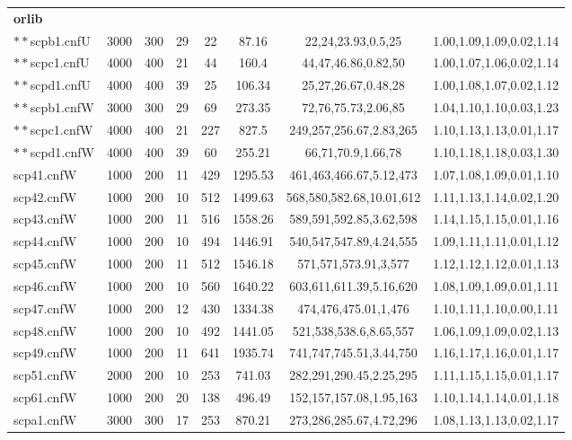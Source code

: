 \begin{table*}[t!]
{\begin{tabular}{lccccccc}
{\bf orlib}     &      &     &    &    &       &                    &\\ 
 $**$scpb1.cnfU & 3000 & 300 & 29 & 22 & 87.16 & 22,24,23.93,0.5,25 & 1.00,1.09,1.09,0.02,1.14 \\ 
 $**$scpc1.cnfU & 4000 & 400 & 21 & 44 & 160.4 & 44,47,46.86,0.82,50 & 1.00,1.07,1.06,0.02,1.14 \\ 
 $**$scpd1.cnfU & 4000 & 400 & 39 & 25 & 106.34 & 25,27,26.67,0.48,28 & 1.00,1.08,1.07,0.02,1.12 \\ 
 $**$scpb1.cnfW & 3000 & 300 & 29 & 69 & 273.35 & 72,76,75.73,2.06,85 & 1.04,1.10,1.10,0.03,1.23 \\ 
 $**$scpc1.cnfW & 4000 & 400 & 21 & 227 & 827.5 & 249,257,256.67,2.83,265 & 1.10,1.13,1.13,0.01,1.17 \\ 
 $**$scpd1.cnfW & 4000 & 400 & 39 & 60 & 255.21 & 66,71,70.9,1.66,78 & 1.10,1.18,1.18,0.03,1.30 \\
 scp41.cnfW & 1000 & 200 & 11 & 429 & 1295.53 & 461,463,466.67,5.12,473 & 1.07,1.08,1.09,0.01,1.10 \\ 
 scp42.cnfW & 1000 & 200 & 10 & 512 & 1499.63 & 568,580,582.68,10.01,612 & 1.11,1.13,1.14,0.02,1.20 \\ 
 scp43.cnfW & 1000 & 200 & 11 & 516 & 1558.26 & 589,591,592.85,3.62,598 & 1.14,1.15,1.15,0.01,1.16 \\ 
 scp44.cnfW & 1000 & 200 & 10 & 494 & 1446.91 & 540,547,547.89,4.24,555 & 1.09,1.11,1.11,0.01,1.12 \\ 
 scp45.cnfW & 1000 & 200 & 11 & 512 & 1546.18 & 571,571,573.91,3,577 & 1.12,1.12,1.12,0.01,1.13 \\ 
 scp46.cnfW & 1000 & 200 & 10 & 560 & 1640.22 & 603,611,611.39,5.16,620 & 1.08,1.09,1.09,0.01,1.11 \\ 
 scp47.cnfW & 1000 & 200 & 12 & 430 & 1334.38 & 474,476,475.01,1,476 & 1.10,1.11,1.10,0.00,1.11 \\ 
 scp48.cnfW & 1000 & 200 & 10 & 492 & 1441.05 & 521,538,538.6,8.65,557 & 1.06,1.09,1.09,0.02,1.13 \\ 
 scp49.cnfW & 1000 & 200 & 11 & 641 & 1935.74 & 741,747,745.51,3.44,750 & 1.16,1.17,1.16,0.01,1.17 \\ 
 scp51.cnfW & 2000 & 200 & 10 & 253 & 741.03 & 282,291,290.45,2.25,295 & 1.11,1.15,1.15,0.01,1.17 \\ 
 scp61.cnfW & 1000 & 200 & 20 & 138 & 496.49 & 152,157,157.08,1.95,163 & 1.10,1.14,1.14,0.01,1.18 \\ 
 scpa1.cnfW & 3000 & 300 & 17 & 253 & 870.21 & 273,286,285.67,4.72,296 & 1.08,1.13,1.13,0.02,1.17 \\ 


\end{tabular}}
\end{table*}
